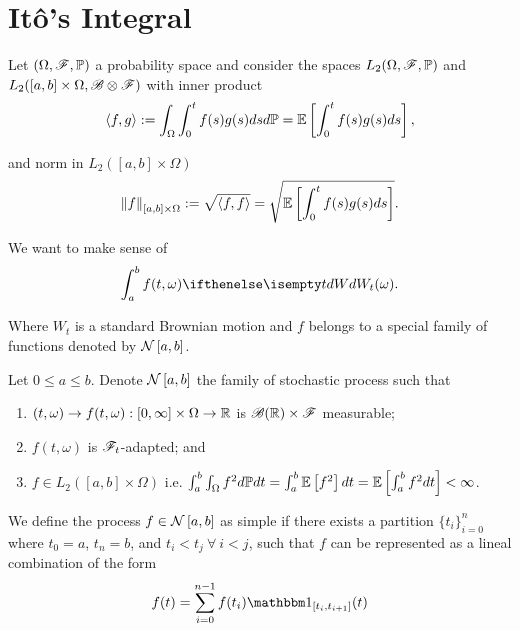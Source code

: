 \documentclass[../TGMAFFIRO.tex]{subfiles}
\begin{document}
\section{It\^o's Integral}
Let $(\Omega, \mathscr{F}, \mathbb{P})$ a probability space and consider the spaces $L_2(\Omega, \mathscr{F}, \mathbb{P})$ and $L_2([a, b]\times\Omega, \mathscr{B}\otimes\mathscr{F})$ with inner product
\begin{equation}
  \langle f, g\rangle := \int_\Omega\int_0^t f(s) g(s) ds d\mathbb{P} = \mathbb{E}\left[\int_0^t f(s)g(s) ds\right],
\end{equation}


and norm in $L_2([a, b] \times \Omega)$
\begin{equation}
  \left\lVert f\right\rVert_{[a, b] \times \Omega} := \sqrt{\langle f, f\rangle} = \sqrt{\mathbb{E}\left[\int_0^t f(s)g(s) ds\right]}.
\end{equation}

We want to make sense of
\begin{equation}
  \int_a^bf(t,\omega) \dW[t](\omega).
\end{equation}

Where $W_t$ is a standard Brownian motion and $f$ belongs to a special family of functions denoted by $\mathcal{N}\left[a, b\right]$.

\begin{definition}
	Let $0\leq a\leq b$. Denote $\mathcal{N}\left[a, b\right]$ the family of stochastic process such that
	\begin{enumerate}
		\item $(t, \omega) \to f(t, \omega):[0, \infty]\times\Omega \to \mathbb{R}$ is $\mathscr{B}(\mathbb{R})\times\mathscr{F}$ measurable;
		\item $f(t,\omega)$ is $\mathscr{F}_t$-adapted; and
		\item $f\in L_2([a,b]\times\Omega)$ i.e. $\int_a^b\int_\Omega f^2 d\mathbb{P} dt = \int_a^b\mathbb{E}\left[f^2\right]dt = \mathbb{E}\left[\int_a^b f^2 dt\right] < \infty$.
	\end{enumerate}
\end{definition}

\begin{definition}
	We define the process $f\in \mathcal{N}\left[a, b\right]$ as simple if there exists a partition $\{t_i\}_{i=0}^n$ where $t_0 = a$, $t_n = b$, and $t_i < t_j \ \forall \ i < j$, such that $f$ can be represented as a lineal combination of the form
	\begin{equation}
		f(t) = \sum_{i=0}^{n-1}f(t_i)\ind_{[t_i, t_{i+1}]}(t)
	\end{equation}
\end{definition}
\end{document}
